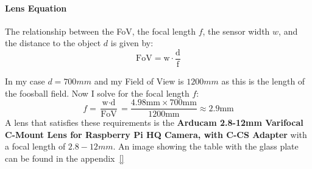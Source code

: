 \paragraph{Lens Equation}\label{par:lens_equation}

The relationship between the FoV, the focal length $f$, the sensor width $w$, and the distance to the object $d$ is given by:
\begin{equation}
    \text{FoV} = \text{w} \cdot \frac{\text{d}}{\text{f}}\label{eq:lens_equation}
\end{equation}


\noindent In my case $d = 700mm$ and my Field of View is $1200mm$ as this is the length of the foosball field.
Now I solve for the focal length $f$:
\begin{equation}
    \label{eq:focal_length}
    f = \frac{\text{w} \cdot \text{d}}{\text{FoV}} = \frac{4.98\text{mm} \times 700\text{mm}}{1200\text{mm}} \approx 2.9\text{mm}
\end{equation}
A lens that satisfies these requirements is the \textbf{Arducam 2.8-12mm Varifocal C-Mount Lens for Raspberry Pi HQ Camera, with C-CS Adapter} with a focal length of $2.8-12mm$.
An image showing the table with the glass plate can be found in the appendix~\ref{}